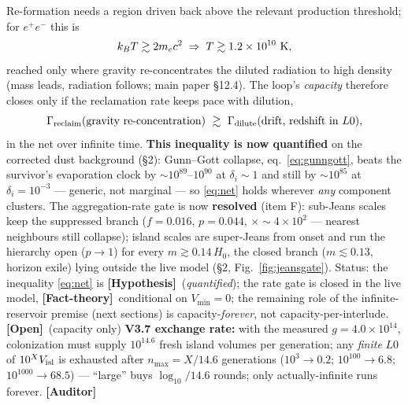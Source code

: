 \documentclass[11pt]{article}
\newcommand{\Hyp}{\textbf{\textcolor{blue!55!black}{[Hypothesis]}}}
\newcommand{\Open}{\textbf{\textcolor{gray!10!black}{[Open]}}}
\newcommand{\Auditor}{\textbf{\textcolor{teal!55!black}{[Auditor]}}}
\newcommand{\factth}{\textcolor{green!40!black}{\textbf{[Fact-theory]}}}
\begin{document}
Re-formation needs a region driven back above the relevant production threshold; for $e^+e^-$ this is
\begin{equation}
k_B T \gtrsim 2 m_e c^2 \;\Rightarrow\; T\gtrsim 1.2\times10^{10}\ {\rm K},
\label{eq:pair}
\end{equation}
reached only where gravity re-concentrates the diluted radiation to high density (mass leads, radiation follows; main paper \S12.4). The loop's \emph{capacity} therefore closes only if the reclamation rate keeps pace with dilution,
\begin{equation}
\Gamma_{\rm reclaim}(\text{gravity re-concentration})\ \gtrsim\ \Gamma_{\rm dilute}(\text{drift, redshift in }L0),
\label{eq:net}
\end{equation}
in the net over infinite time. \textbf{This inequality is now quantified} on the corrected dust background (\S2): Gunn--Gott collapse, eq.~\eqref{eq:gunngott}, beats the survivor's evaporation clock by $\sim\!10^{89}$--$10^{90}$ at $\delta_i\sim1$ and still by $\sim\!10^{85}$ at $\delta_i=10^{-3}$ --- generic, not marginal --- so \eqref{eq:net} holds wherever \emph{any} component clusters. The aggregation-rate gate is now \textbf{resolved} (item F): sub-Jeans scales keep the suppressed branch ($f=0.016$, $p=0.044$, $\times\!\sim\!4\times10^{2}$ --- nearest neighbours still collapse); island scales are super-Jeans from onset and run the hierarchy open ($p\to1$) for every $m\gtrsim0.14\,H_0$, the closed branch ($m\lesssim0.13$, horizon exile) lying outside the live model (\S2, Fig.~\ref{fig:jeansgate}). Status: the inequality \eqref{eq:net} is \Hyp\ (\emph{quantified}); the rate gate is closed in the live model, \factth\ conditional on $V_{\min}=0$; the remaining role of the infinite-reservoir premise (next sections) is capacity-\emph{forever}, not capacity-per-interlude. \Open\ (capacity only) \textbf{V3.7 exchange rate:} with the measured $g=4.0\times10^{14}$, colonization must supply $10^{14.6}$ fresh island volumes per generation; any \emph{finite} $L0$ of $10^{X}V_{\rm isl}$ is exhausted after $n_{\max}=X/14.6$ generations ($10^{3}\to0.2$; $10^{100}\to6.8$; $10^{1000}\to68.5$) --- ``large'' buys $\log_{10}/14.6$ rounds; only actually-infinite runs forever. \Auditor

\end{document}
